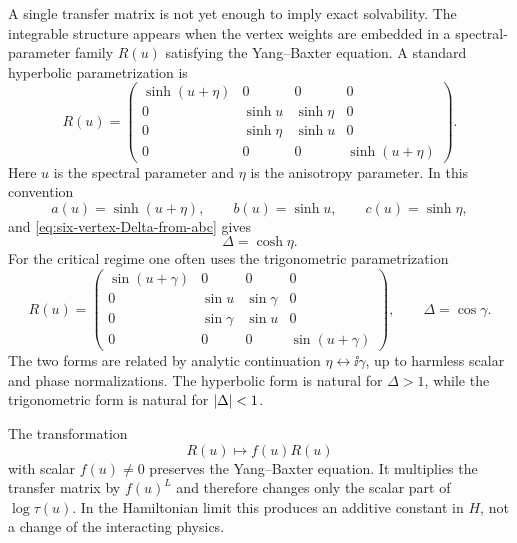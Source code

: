 A single transfer matrix is not yet enough to imply exact solvability.  The
integrable structure appears when the vertex weights are embedded in a
spectral-parameter family $R(u)$ satisfying the Yang--Baxter equation.  A standard
hyperbolic parametrization is
\begin{equation}
\label{eq:six-vertex-R-hyperbolic}
    R(u)=
    \begin{pmatrix}
        \sinh(u+\eta)&0&0&0\\
        0&\sinh u&\sinh\eta&0\\
        0&\sinh\eta&\sinh u&0\\
        0&0&0&\sinh(u+\eta)
    \end{pmatrix}.
\end{equation}
Here $u$ is the spectral parameter and $\eta$ is the anisotropy parameter.  In
this convention
\begin{equation}
\label{eq:six-vertex-hyperbolic-weights}
    a(u)=\sinh(u+\eta),
    \qquad
    b(u)=\sinh u,
    \qquad
    c(u)=\sinh\eta,
\end{equation}
and \cref{eq:six-vertex-Delta-from-abc} gives
\begin{equation}
\label{eq:xxz-Delta-cosh-eta}
    \Delta=\cosh\eta .
\end{equation}
For the critical regime one often uses the trigonometric parametrization
\begin{equation}
\label{eq:six-vertex-R-trigonometric}
    R(u)=
    \begin{pmatrix}
        \sin(u+\gamma)&0&0&0\\
        0&\sin u&\sin\gamma&0\\
        0&\sin\gamma&\sin u&0\\
        0&0&0&\sin(u+\gamma)
    \end{pmatrix},
    \qquad
    \Delta=\cos\gamma .
\end{equation}
The two forms are related by analytic continuation $\eta\leftrightarrow \ii\gamma$,
up to harmless scalar and phase normalizations.  The hyperbolic form is natural
for $\Delta>1$, while the trigonometric form is natural for $\left|\Delta\right|<1$.

\begin{remark}
The transformation
\begin{equation}
    R(u)\longmapsto f(u)R(u)
\end{equation}
with scalar $f(u)\neq0$ preserves the Yang--Baxter equation.  It multiplies the
transfer matrix by $f(u)^L$ and therefore changes only the scalar part of
$\log\tau(u)$.  In the Hamiltonian limit this produces an additive constant in
$H$, not a change of the interacting physics.
\end{remark}

